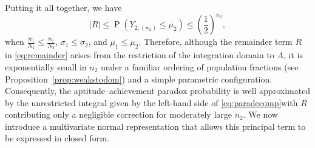 \documentclass[12pt]{article}
\DeclareMathOperator*{\Prob}{P}
\begin{document}
Putting it all together, we have
$$
  |R| \leq \Prob\left(Y_{2,(n_2)} \leq \mu_2\right) \leq \left(\frac{1}{2}\right)^{n_2},
$$
when $\frac{n_1}{N_1} \leq \frac{n_2}{N_2}$, $\sigma_1 \leq \sigma_2$, and $\mu_1 \leq \mu_2$. Therefore, although the remainder term $R$ in \eqref{eq:remainder} arises from the restriction of the integration domain to $A$, it is exponentially small in $n_2$ under a familiar ordering of population fractions (see Proposition~\ref{prop:weakstodom}) and a simple parametric configuration. Consequently, the aptitude--achievement paradox probability is well approximated by the unrestricted integral given by the left-hand side of \eqref{eq:paradecomp}with $R$ contributing only a negligible correction for moderately large $n_2$. We now introduce a multivariate normal representation that allows this principal term to be expressed in closed form.
\end{document}
